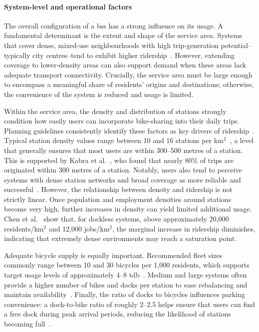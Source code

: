         
        \paragraph{System-level and operational factors\\}

        The overall configuration of a \ac{bss} has a strong influence on its usage. A fundamental determinant is the extent and shape of the service area. Systems that cover dense, mixed-use neighbourhoods with high trip-generation potential--typically city centres--tend to exhibit higher ridership~\cite{Yanocha2018}. However, extending coverage to lower-density areas can also support demand when these areas lack adequate transport connectivity. Crucially, the service area must be large enough to encompass a meaningful share of residents’ origins and destinations; otherwise, the convenience of the system is reduced and usage is limited.

        Within the service area, the density and distribution of stations strongly condition how easily users can incorporate bike-sharing into their daily trips. Planning guidelines consistently identify these factors as key drivers of ridership~\cite{Yanocha2018, Ferrando2007, OBIS2011}. Typical station density values range between 10 and 16 stations per km$^{2}$~\cite{Yanocha2018, Ferrando2007, OBIS2011}, a level that generally ensures that most users are within 300–500 metres of a station. This is supported by Kabra et al.~\cite{Kabra2018}, who found that nearly 80\% of trips are originated within 300 metres of a station. Notably, users also tend to perceive systems with dense station networks and broad coverage as more reliable and successful~\cite{OBIS2011}. However, the relationship between density and ridership is not strictly linear. Once population and employment densities around stations become very high, further increases in density can yield limited additional usage. Chen et al.~\cite{Chen2021_Identifying} show that, for dockless systems, above approximately 20,000 residents/km$^{2}$ and 12,000 jobs/km$^{2}$, the marginal increase in ridership diminishes, indicating that extremely dense environments may reach a saturation point.

        Adequate bicycle supply is equally important. Recommended fleet sizes commonly range between 10 and 30 bicycles per 1,000 residents, which supports target usage levels of approximately 4–8 \ac{tdb}~\cite{Yanocha2018}. Medium and large systems often provide a higher number of bikes and docks per station to ease rebalancing and maintain availability~\cite{OBIS2011}. Finally, the ratio of docks to bicycles influences parking convenience: a dock-to-bike ratio of roughly 2–2.5 helps ensure that users can find a free dock during peak arrival periods, reducing the likelihood of stations becoming full~\cite{Yanocha2018}.

